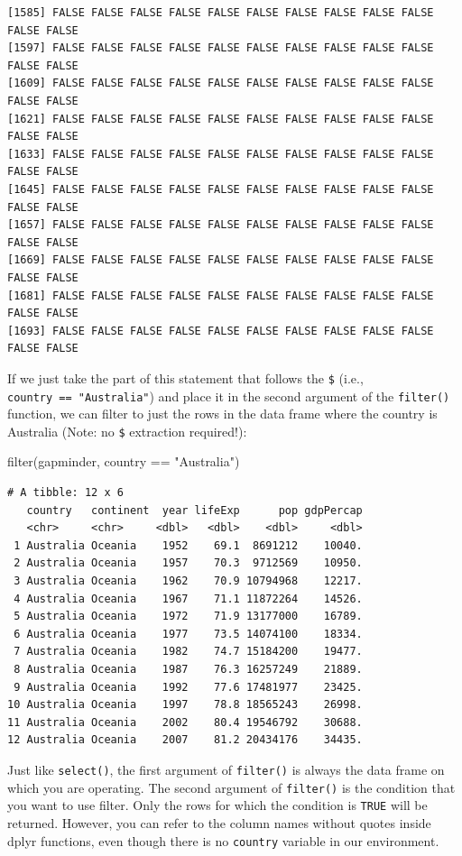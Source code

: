 \documentclass[
  letterpaper,
  DIV=11,
  numbers=noendperiod]{scrreprt}
\newenvironment{Shaded}{\begin{snugshade}}{\end{snugshade}}
\newcommand{\FunctionTok}[1]{\textcolor[rgb]{0.28,0.35,0.67}{#1}}
\newcommand{\NormalTok}[1]{\textcolor[rgb]{0.00,0.23,0.31}{#1}}
\newcommand{\SpecialCharTok}[1]{\textcolor[rgb]{0.37,0.37,0.37}{#1}}
\newcommand{\StringTok}[1]{\textcolor[rgb]{0.13,0.47,0.30}{#1}}
\begin{document}
\begin{verbatim}
[1585] FALSE FALSE FALSE FALSE FALSE FALSE FALSE FALSE FALSE FALSE FALSE FALSE
[1597] FALSE FALSE FALSE FALSE FALSE FALSE FALSE FALSE FALSE FALSE FALSE FALSE
[1609] FALSE FALSE FALSE FALSE FALSE FALSE FALSE FALSE FALSE FALSE FALSE FALSE
[1621] FALSE FALSE FALSE FALSE FALSE FALSE FALSE FALSE FALSE FALSE FALSE FALSE
[1633] FALSE FALSE FALSE FALSE FALSE FALSE FALSE FALSE FALSE FALSE FALSE FALSE
[1645] FALSE FALSE FALSE FALSE FALSE FALSE FALSE FALSE FALSE FALSE FALSE FALSE
[1657] FALSE FALSE FALSE FALSE FALSE FALSE FALSE FALSE FALSE FALSE FALSE FALSE
[1669] FALSE FALSE FALSE FALSE FALSE FALSE FALSE FALSE FALSE FALSE FALSE FALSE
[1681] FALSE FALSE FALSE FALSE FALSE FALSE FALSE FALSE FALSE FALSE FALSE FALSE
[1693] FALSE FALSE FALSE FALSE FALSE FALSE FALSE FALSE FALSE FALSE FALSE FALSE
\end{verbatim}

If we just take the part of this statement that follows the \texttt{\$}
(i.e., \texttt{country\ ==\ "Australia"}) and place it in the second
argument of the \texttt{filter()} function, we can filter to just the
rows in the data frame where the country is Australia (Note: no
\texttt{\$} extraction required!):

\begin{Shaded}
\begin{Highlighting}[]
\FunctionTok{filter}\NormalTok{(gapminder, country }\SpecialCharTok{==} \StringTok{"Australia"}\NormalTok{)}
\end{Highlighting}
\end{Shaded}

\begin{verbatim}
# A tibble: 12 x 6
   country   continent  year lifeExp      pop gdpPercap
   <chr>     <chr>     <dbl>   <dbl>    <dbl>     <dbl>
 1 Australia Oceania    1952    69.1  8691212    10040.
 2 Australia Oceania    1957    70.3  9712569    10950.
 3 Australia Oceania    1962    70.9 10794968    12217.
 4 Australia Oceania    1967    71.1 11872264    14526.
 5 Australia Oceania    1972    71.9 13177000    16789.
 6 Australia Oceania    1977    73.5 14074100    18334.
 7 Australia Oceania    1982    74.7 15184200    19477.
 8 Australia Oceania    1987    76.3 16257249    21889.
 9 Australia Oceania    1992    77.6 17481977    23425.
10 Australia Oceania    1997    78.8 18565243    26998.
11 Australia Oceania    2002    80.4 19546792    30688.
12 Australia Oceania    2007    81.2 20434176    34435.
\end{verbatim}

Just like \texttt{select()}, the first argument of \texttt{filter()} is
always the data frame on which you are operating. The second argument of
\texttt{filter()} is the condition that you want to use filter. Only the
rows for which the condition is \texttt{TRUE} will be returned. However,
you can refer to the column names without quotes inside dplyr functions,
even though there is no \texttt{country} variable in our environment.
\end{document}
